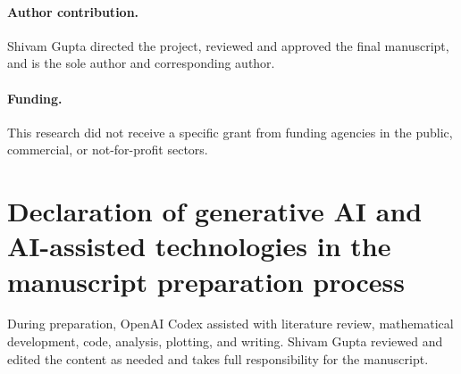 \documentclass[11pt]{article}
\begin{document}
\paragraph{Author contribution.}
Shivam Gupta directed the project, reviewed and approved the final manuscript, and is the sole author and corresponding author.

\paragraph{Funding.}
This research did not receive a specific grant from funding agencies in the public, commercial, or not-for-profit sectors.

\section*{Declaration of generative AI and AI-assisted technologies in the manuscript preparation process}
During preparation, OpenAI Codex assisted with literature review, mathematical development, code, analysis, plotting, and writing. Shivam Gupta reviewed and edited the content as needed and takes full responsibility for the manuscript.
\end{document}
